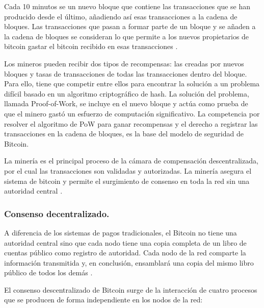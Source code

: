\vspace{5mm}

\noindent Cada 10 minutos se  un nuevo bloque que contiene las transacciones que se han producido desde el 
último, añadiendo así esas transacciones a la cadena de bloques. Las transacciones que pasan a formar parte de un bloque 
y se añaden a la cadena de bloques se consideran  lo que permite a los nuevos propietarios de bitcoin 
gastar el bitcoin recibido en esas transacciones \cite{antonopoulos2014mastering}.

\vspace{5mm}

\noindent Los mineros pueden recibir dos tipos de recompensas: las creadas por nuevos bloques y tasas de transacciones 
de todas las transacciones dentro del bloque. Para ello, tiene que competir entre ellos para encontrar la solución a 
un problema difícil basado en un algoritmo criptográfico de hash. La solución del problema, llamada Proof-of-Work, 
se incluye en el nuevo bloque y actúa como prueba de que el minero gastó un esfuerzo de computación significativo. 
La competencia por resolver el algoritmo de PoW para ganar recompensas y el derecho a registrar las transacciones 
en la cadena de bloques, es la base del modelo de seguridad de Bitcoin.

\vspace{5mm}

\noindent La minería es el principal proceso de la cámara de compensación descentralizada, por el cual las transacciones 
son validadas y autorizadas. La minería asegura el sistema de bitcoin y permite el surgimiento de consenso en toda la 
red sin una autoridad central \cite{antonopoulos2014mastering}.

\subsubsection*{Consenso decentralizado.}

A diferencia de los sistemas de pagos tradicionales, el Bitcoin no tiene una autoridad central sino que cada nodo tiene
una copia completa de un libro de cuentas público como registro de autoridad. Cada nodo de la red comparte la 
información transmitida y, en conclusión, ensamblará una copia del mismo libro público de todos los demás 
\cite{antonopoulos2014mastering}.

\vspace{5mm}

\noindent El consenso descentralizado de Bitcoin surge de la interacción de cuatro procesos que se producen de forma 
independiente en los nodos de la red:

